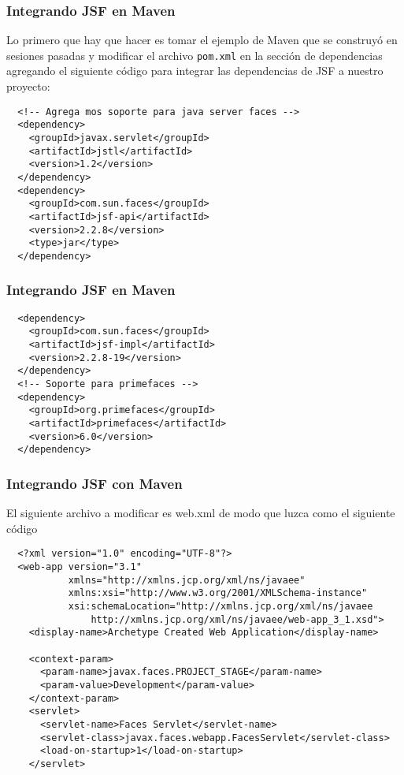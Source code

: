 \documentclass{beamer}
\begin{document}
\begin{frame}[fragile]
  \frametitle{Integrando JSF en Maven}
  Lo primero que hay que hacer es tomar el ejemplo de Maven que se
  construyó en sesiones pasadas y modificar el archivo \texttt{pom.xml}
  en la sección de dependencias agregando el siguiente código para
  integrar las dependencias de JSF a nuestro proyecto:

  \begin{verbatim}
  <!-- Agrega mos soporte para java server faces -->
  <dependency>
    <groupId>javax.servlet</groupId>
    <artifactId>jstl</artifactId>
    <version>1.2</version>
  </dependency>
  <dependency>
    <groupId>com.sun.faces</groupId>
    <artifactId>jsf-api</artifactId>
    <version>2.2.8</version>
    <type>jar</type>
  </dependency>
  \end{verbatim}
\end{frame}

\begin{frame}[fragile]
  \frametitle{Integrando JSF en Maven}
  \begin{verbatim}
  <dependency>
    <groupId>com.sun.faces</groupId>
    <artifactId>jsf-impl</artifactId>
    <version>2.2.8-19</version>
  </dependency>
  <!-- Soporte para primefaces -->
  <dependency>
    <groupId>org.primefaces</groupId>
    <artifactId>primefaces</artifactId>
    <version>6.0</version>
  </dependency>
  \end{verbatim}
\end{frame}

\begin{frame}[fragile]
  \frametitle{Integrando JSF con Maven}
  El siguiente archivo a modificar es web.xml de modo que luzca como
  el siguiente código

  \begin{verbatim}
  <?xml version="1.0" encoding="UTF-8"?>
  <web-app version="3.1"
           xmlns="http://xmlns.jcp.org/xml/ns/javaee"
           xmlns:xsi="http://www.w3.org/2001/XMLSchema-instance"
           xsi:schemaLocation="http://xmlns.jcp.org/xml/ns/javaee
               http://xmlns.jcp.org/xml/ns/javaee/web-app_3_1.xsd">
    <display-name>Archetype Created Web Application</display-name>

    <context-param>
      <param-name>javax.faces.PROJECT_STAGE</param-name>
      <param-value>Development</param-value>
    </context-param>
    <servlet>
      <servlet-name>Faces Servlet</servlet-name>
      <servlet-class>javax.faces.webapp.FacesServlet</servlet-class>
      <load-on-startup>1</load-on-startup>
    </servlet>
  \end{verbatim}
\end{frame}
\end{document}
